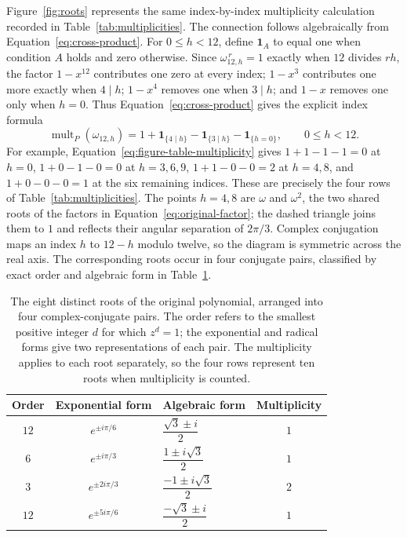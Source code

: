 \documentclass[11pt,a4paper]{article}
\numberwithin{equation}{section}
\theoremstyle{uprightpaper}
\newcommand{\mult}{\operatorname{mult}}
\begin{document}
Figure~\ref{fig:roots} represents the same index-by-index
multiplicity calculation recorded in Table~\ref{tab:multiplicities}.
The connection follows algebraically from Equation~\eqref{eq:cross-product}.
For $0\leq h<12$, define $\mathbf1_{A}$ to equal one when condition
$A$ holds and zero otherwise. Since
$\omega_{12,h}^{\,r}=1$ exactly when $12$ divides $rh$,
the factor $1-x^{12}$ contributes one zero at every index;
$1-x^3$ contributes one more exactly when $4\mid h$;
$1-x^4$ removes one when $3\mid h$; and $1-x$ removes one
only when $h=0$. Thus Equation~\eqref{eq:cross-product} gives the
explicit index formula
\begin{equation}\label{eq:figure-table-multiplicity}
 \mult_P(\omega_{12,h})
 =1+\mathbf1_{\{4\mid h\}}
  -\mathbf1_{\{3\mid h\}}-\mathbf1_{\{h=0\}},
 \qquad 0\leq h<12.
\end{equation}
For example, Equation~\eqref{eq:figure-table-multiplicity} gives
$1+1-1-1=0$ at $h=0$, $1+0-1-0=0$ at $h=3,6,9$,
$1+1-0-0=2$ at $h=4,8$, and $1+0-0-0=1$ at the six
remaining indices. These are precisely the four rows of
Table~\ref{tab:multiplicities}. The points $h=4,8$ are $\omega$ and $\omega^2$, the two shared
roots of the factors in Equation~\eqref{eq:original-factor}; the dashed
triangle joins them to $1$ and reflects their angular separation
of $2\pi/3$. Complex conjugation maps an index $h$ to $12-h$
modulo twelve, so the diagram is symmetric across the real axis.
The corresponding roots occur in four conjugate pairs, classified by
exact order and algebraic form in Table~\ref{tab:conjugatepairs}.
\begin{table}[H]
\centering
\caption{The eight distinct roots of the original polynomial, arranged
into four complex-conjugate pairs. The order refers to the smallest
positive integer $d$ for which $z^d=1$; the exponential and radical
forms give two representations of each pair. The multiplicity applies
to each root separately, so the four rows represent ten roots when
multiplicity is counted.}
\label{tab:conjugatepairs}
\renewcommand{\arraystretch}{1.42}
\begin{tabular}{@{}cclc@{}}
\toprule
Order & Exponential form & Algebraic form & Multiplicity \\
\midrule
$12$ & $e^{\pm i\pi/6}$ & $\dfrac{\sqrt3\pm i}{2}$ & $1$ \\
$6$ & $e^{\pm i\pi/3}$ & $\dfrac{1\pm i\sqrt3}{2}$ & $1$ \\
$3$ & $e^{\pm 2i\pi/3}$ & $\dfrac{-1\pm i\sqrt3}{2}$ & $2$ \\
$12$ & $e^{\pm 5i\pi/6}$ & $\dfrac{-\sqrt3\pm i}{2}$ & $1$ \\
\bottomrule
\end{tabular}
\end{table}
\end{document}
